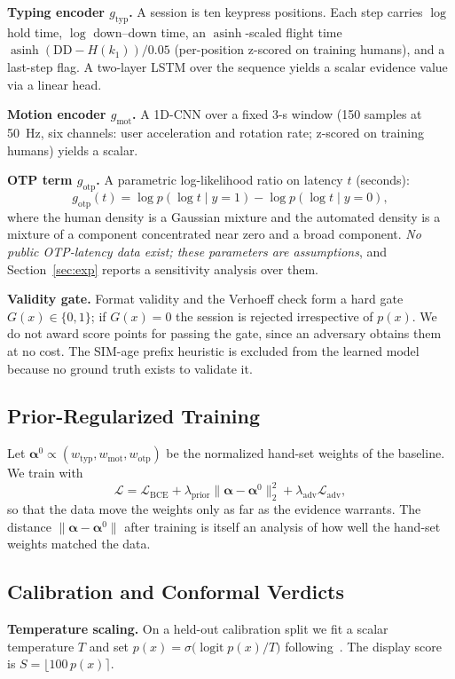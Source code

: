 \documentclass[conference]{IEEEtran}
\begin{document}
\textbf{Typing encoder $g_{\text{typ}}$.} A session is ten keypress positions. Each step carries $\log$ hold time, $\log$ down--down time, an $\operatorname{asinh}$-scaled flight time $\operatorname{asinh}(\text{DD}-H(k_1))/0.05$ (per-position z-scored on training humans), and a last-step flag. A two-layer LSTM over the sequence yields a scalar evidence value via a linear head.

\textbf{Motion encoder $g_{\text{mot}}$.} A 1D-CNN over a fixed 3-s window (150 samples at 50~Hz, six channels: user acceleration and rotation rate; z-scored on training humans) yields a scalar.

\textbf{OTP term $g_{\text{otp}}$.} A parametric log-likelihood ratio on latency $t$ (seconds):
\begin{equation}
g_{\text{otp}}(t)=\log p(\log t\mid y{=}1)-\log p(\log t\mid y{=}0),
\end{equation}
where the human density is a Gaussian mixture and the automated density is a mixture of a component concentrated near zero and a broad component. \emph{No public OTP-latency data exist; these parameters are assumptions}, and Section~\ref{sec:exp} reports a sensitivity analysis over them.

\textbf{Validity gate.} Format validity and the Verhoeff check form a hard gate $G(x)\in\{0,1\}$; if $G(x)=0$ the session is rejected irrespective of $p(x)$. We do not award score points for passing the gate, since an adversary obtains them at no cost. The SIM-age prefix heuristic is excluded from the learned model because no ground truth exists to validate it.

\subsection{Prior-Regularized Training}
Let $\boldsymbol{\alpha}^0\propto(w_{\text{typ}},w_{\text{mot}},w_{\text{otp}})$ be the normalized hand-set weights of the baseline. We train with
\begin{equation}
\mathcal{L}=\mathcal{L}_{\text{BCE}}+\lambda_{\text{prior}}\lVert\boldsymbol{\alpha}-\boldsymbol{\alpha}^0\rVert_2^2+\lambda_{\text{adv}}\mathcal{L}_{\text{adv}},
\label{eq:loss}
\end{equation}
so that the data move the weights only as far as the evidence warrants. The distance $\lVert\boldsymbol{\alpha}-\boldsymbol{\alpha}^0\rVert$ after training is itself an analysis of how well the hand-set weights matched the data.

\subsection{Calibration and Conformal Verdicts}
\textbf{Temperature scaling.} On a held-out calibration split we fit a scalar temperature $T$ and set $p(x)=\sigma\!\big(\operatorname{logit}p(x)/T\big)$ following~\cite{guo2017}. The display score is $S=\lfloor 100\,p(x)\rceil$.
\end{document}
